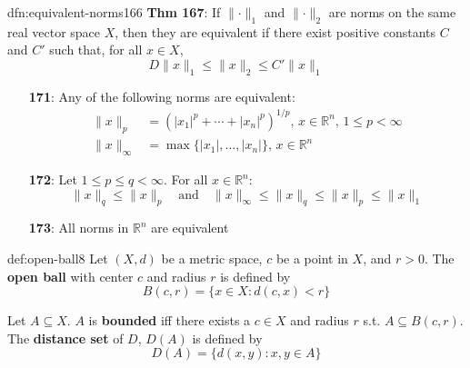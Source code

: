 \documentclass[landscape, 8pt]{extarticle}
\begin{document}
\begin{multicols}{3}
\begin{dfn}{dfn:equivalent-norms}{166}
    \vspace{-3pt}
    \longrule{0.08ex}
    \textbf{Thm 167}: If $\lVert \cdot \rVert_{1}$ and $\lVert \cdot \rVert_{2}$ are norms on the same real vector space $X$, then they are equivalent if there exist positive constants $C$ and $C'$ such that, for all $x\in X$,
    \[D \lVert x \rVert_{1} \le \lVert x \rVert_{2} \le C' \lVert x \rVert_{1}\]

    \vspace{-5pt}

    \vspace{-10pt}
    \begin{itemize}
        \item[\textbf{171}:] Any of the following norms are equivalent:
            \begin{align*}
                \lVert x \rVert_{p} &= (\lvert x_{1} \rvert^{p} + \cdots + \lvert x_{n} \rvert^{p})^{1 /p},\,x\in \mathbb{R}^{n},\, 1\le p < \infty\\
                \lVert x \rVert_{\infty} &= \max \{\lvert x_{1} \rvert,\dots,\lvert x_{n} \rvert\},\,x\in\mathbb{R}^{n}
            \end{align*}
    \vspace{-12pt}
    \item[\textbf{172}:] Let $1 \le p \le q < \infty$. For all $x\in\mathbb{R}^{n}$:
            \[\lVert x \rVert_{q} \le \lVert x \rVert_{p} \quad\text{and} \quad \lVert x \rVert_{\infty} \le \lVert x \rVert_{q} \le \lVert x \rVert_{p} \le \lVert x \rVert_{1}\]
    \vspace{-11pt}
    \item[\textbf{173}:] All norms in $\mathbb{R}^{n}$ are equivalent
    \end{itemize}
\end{dfn}

\vspace{-5pt}
\begin{dfn}{def:open-ball}{8}
    \vspace{-5pt}
    Let $(X, d)$ be a metric space, $c$ be a point in $X$, and $r > 0$. The \textbf{open ball} with center $c$ and radius $r$ is defined by
    \[B(c,r) = \{x\in X: d(c,x) < r\}\]

    \vspace{-3pt}
    \vspace{-3pt}

    Let $A \subseteq X$. $A$ is \textbf{bounded} iff there exists a $c\in X$ and radius $r$ s.t. $A \subseteq B(c, r)$. The \textbf{distance set} of $D$, $D(A)$ is defined by
    \[D(A) = \{d(x, y) : x, y\in A\}\]


\end{dfn}
\end{multicols}
\end{document}

